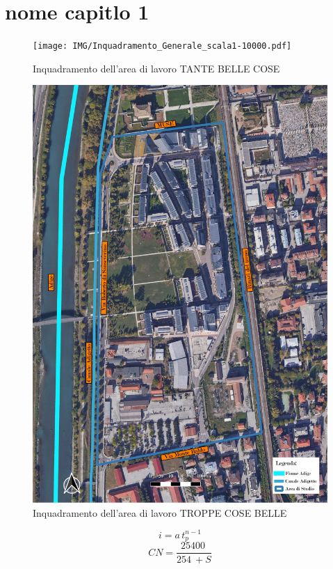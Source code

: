 \chapter{nome capitlo 1}
\begin{figure}[p]
    \centering
    \texttt{[image: IMG/Inquadramento\_Generale\_scala1-10000.pdf]} 
    \caption{Inquadramento dell'area di lavoro  TANTE BELLE COSE}
    \label{fig:inquadramentoGenerale}
\end{figure}
\begin{figure}[p]
    \centering
    \includegraphics[trim=0cm 0cm 0cm 0cm,clip,frame,width=\textwidth]{IMG/Inquadramento_scala1-2800.pdf} 
    \caption{Inquadramento dell'area di lavoro TROPPE  COSE BELLE}
    \label{fig:inquadramentoDettaglio}
\end{figure}

\begin{equation}
    i = a \, t_p ^{n - 1}
\end{equation}
\begin{equation}
    CN = \frac{\SI{25400}{}}{\SI{254}{} + S}
\end{equation}

